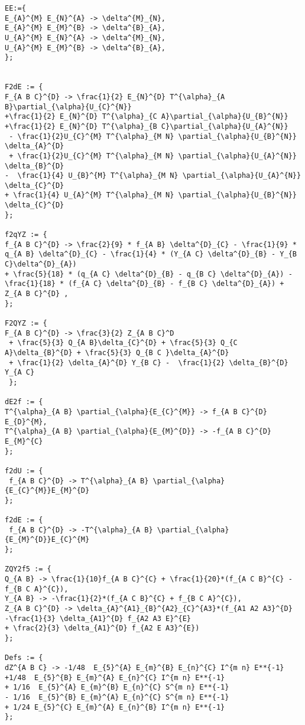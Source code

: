 \documentclass[11pt]{article}
\begin{document}
{\begin{verbatim}
EE:={
E_{A}^{M} E_{N}^{A} -> \delta^{M}_{N},
E_{A}^{M} E_{M}^{B} -> \delta^{B}_{A},
U_{A}^{M} E_{N}^{A} -> \delta^{M}_{N},
U_{A}^{M} E_{M}^{B} -> \delta^{B}_{A},
};


F2dE := {
F_{A B C}^{D} -> \frac{1}{2} E_{N}^{D} T^{\alpha}_{A B}\partial_{\alpha}{U_{C}^{N}}
+\frac{1}{2} E_{N}^{D} T^{\alpha}_{C A}\partial_{\alpha}{U_{B}^{N}}
+\frac{1}{2} E_{N}^{D} T^{\alpha}_{B C}\partial_{\alpha}{U_{A}^{N}}
 - \frac{1}{2}U_{C}^{M} T^{\alpha}_{M N} \partial_{\alpha}{U_{B}^{N}} \delta_{A}^{D}
 + \frac{1}{2}U_{C}^{M} T^{\alpha}_{M N} \partial_{\alpha}{U_{A}^{N}} \delta_{B}^{D}
-  \frac{1}{4} U_{B}^{M} T^{\alpha}_{M N} \partial_{\alpha}{U_{A}^{N}} \delta_{C}^{D}
+ \frac{1}{4} U_{A}^{M} T^{\alpha}_{M N} \partial_{\alpha}{U_{B}^{N}} \delta_{C}^{D}
};

f2qYZ := {
f_{A B C}^{D} -> \frac{2}{9} * f_{A B} \delta^{D}_{C} - \frac{1}{9} * q_{A B} \delta^{D}_{C} - \frac{1}{4} * (Y_{A C} \delta^{D}_{B} - Y_{B C}\delta^{D}_{A})
+ \frac{5}{18} * (q_{A C} \delta^{D}_{B} - q_{B C} \delta^{D}_{A}) - \frac{1}{18} * (f_{A C} \delta^{D}_{B} - f_{B C} \delta^{D}_{A}) + Z_{A B C}^{D} ,
};

F2QYZ := {
F_{A B C}^{D} -> \frac{3}{2} Z_{A B C}^D  
 + \frac{5}{3} Q_{A B}\delta_{C}^{D} + \frac{5}{3} Q_{C A}\delta_{B}^{D} + \frac{5}{3} Q_{B C }\delta_{A}^{D} 
 + \frac{1}{2} \delta_{A}^{D} Y_{B C} -  \frac{1}{2} \delta_{B}^{D} Y_{A C}
 };

dE2f := {
T^{\alpha}_{A B} \partial_{\alpha}{E_{C}^{M}} -> f_{A B C}^{D} E_{D}^{M},
T^{\alpha}_{A B} \partial_{\alpha}{E_{M}^{D}} -> -f_{A B C}^{D} E_{M}^{C}
};

f2dU := {
 f_{A B C}^{D} -> T^{\alpha}_{A B} \partial_{\alpha}{E_{C}^{M}}E_{M}^{D}
};

f2dE := {
 f_{A B C}^{D} -> -T^{\alpha}_{A B} \partial_{\alpha}{E_{M}^{D}}E_{C}^{M}
};

ZQY2f5 := {
Q_{A B} -> \frac{1}{10}f_{A B C}^{C} + \frac{1}{20}*(f_{A C B}^{C} - f_{B C A}^{C}),
Y_{A B} -> -\frac{1}{2}*(f_{A C B}^{C} + f_{B C A}^{C}),
Z_{A B C}^{D} -> \delta_{A}^{A1}_{B}^{A2}_{C}^{A3}*(f_{A1 A2 A3}^{D}  -\frac{1}{3} \delta_{A1}^{D} f_{A2 A3 E}^{E} 
+ \frac{2}{3} \delta_{A1}^{D} f_{A2 E A3}^{E})
};

Defs := {
dZ^{A B C} -> -1/48  E_{5}^{A} E_{m}^{B} E_{n}^{C} I^{m n} E**{-1} 
+1/48  E_{5}^{B} E_{m}^{A} E_{n}^{C} I^{m n} E**{-1} 
+ 1/16  E_{5}^{A} E_{m}^{B} E_{n}^{C} S^{m n} E**{-1} 
- 1/16  E_{5}^{B} E_{m}^{A} E_{n}^{C} S^{m n} E**{-1}
+ 1/24 E_{5}^{C} E_{m}^{A} E_{n}^{B} I^{m n} E**{-1}
};


\end{verbatim}}
\end{document}

